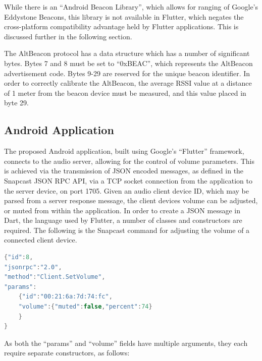 \documentclass[11pt,a4paper,headinclude=false,footinclude=false]{scrreprt}
\begin{document}
While there is an ``Android Beacon Library'', which allows for ranging
of Google's Eddystone Beacons\cite{beaconlibrary}, this library is not
available in Flutter, which negates the cross-platform compatibility
advantage held by Flutter applications. This is discussed further in the
following section.

The AltBeacon protocol has a data structure which has a number of
significant bytes. Bytes 7 and 8 must be set to ``0xBEAC'', which
represents the AltBeacon advertisement code\cite{altbeaconprotocol}.
Bytes 9-29 are reserved for the unique beacon identifier. In order to
correctly calibrate the AltBeacon, the average RSSI value at a distance
of 1 meter from the beacon device must be measured, and this value
placed in byte 29.

\subsection{Android Application}\label{android-application}

The proposed Android application, built using Google's ``Flutter''
framework, connects to the audio server, allowing for the control of
volume parameters. This is achieved via the transmission of JSON encoded
messages, as defined in the Snapcast JSON RPC API\cite{snaprpc}, via a
TCP socket connection from the application to the server device, on port
1705. Given an audio client device ID, which may be parsed from a server
response message, the client devices volume can be adjusted, or muted
from within the application. In order to create a JSON message in Dart,
the language used by Flutter, a number of classes and constructors are
required. The following is the Snapcast command for adjusting the volume
of a connected client device.

\lstset{
    caption=Example Snapcast "Client.SetVolume" Request,
    basicstyle=\footnotesize, frame=tb,
    xleftmargin=.2\textwidth, xrightmargin=.2\textwidth
}

\begin{lstlisting}[language=Java]
{"id":8,
"jsonrpc":"2.0",
"method":"Client.SetVolume",
"params":
    {"id":"00:21:6a:7d:74:fc",
    "volume":{"muted":false,"percent":74}
    }
}
\end{lstlisting}

As both the ``params'' and ``volume'' fields have multiple arguments,
they each require separate constructors, as follows:

\lstset{
    caption=Dart JSON "volume" Field Constructor,
    basicstyle=\footnotesize, frame=tb,
    xleftmargin=.2\textwidth, xrightmargin=.2\textwidth
}
\end{document}
